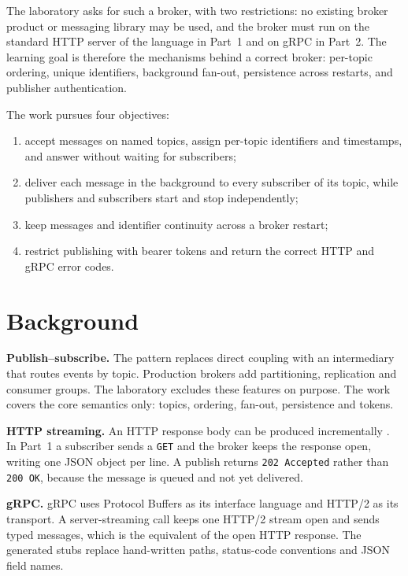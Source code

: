 \documentclass[12pt,a4paper]{article}
\begin{document}
The laboratory asks for such a broker, with two restrictions: no existing broker
product or messaging library may be used, and the broker must run on the
standard HTTP server of the language in Part~1 and on gRPC in Part~2. The
learning goal is therefore the mechanisms behind a correct broker: per-topic
ordering, unique identifiers, background fan-out, persistence across restarts,
and publisher authentication.

The work pursues four objectives:
\begin{enumerate}[itemsep=1pt]
  \item accept messages on named topics, assign per-topic identifiers and
        timestamps, and answer without waiting for subscribers;
  \item deliver each message in the background to every subscriber of its topic,
        while publishers and subscribers start and stop independently;
  \item keep messages and identifier continuity across a broker restart;
  \item restrict publishing with bearer tokens and return the correct HTTP and
        gRPC error codes.
\end{enumerate}

\section{Background}
\textbf{Publish--subscribe.} The pattern replaces direct coupling with an
intermediary that routes events by topic. Production brokers add
partitioning, replication and consumer groups. The laboratory
excludes these features on purpose. The work covers the core semantics only:
topics, ordering, fan-out, persistence and tokens.

\textbf{HTTP streaming.} An HTTP response body can be produced incrementally
. In Part~1 a subscriber sends a \texttt{GET} and the
broker keeps the response open, writing one JSON object per line. A publish
returns \texttt{202 Accepted} rather than \texttt{200 OK}, because the message is
queued and not yet delivered.

\textbf{gRPC.} gRPC uses Protocol Buffers as its interface language and HTTP/2
as its transport. A server-streaming call keeps one
HTTP/2 stream open and sends typed messages, which is the equivalent of the open
HTTP response. The generated stubs replace hand-written paths, status-code
conventions and JSON field names.
\end{document}
